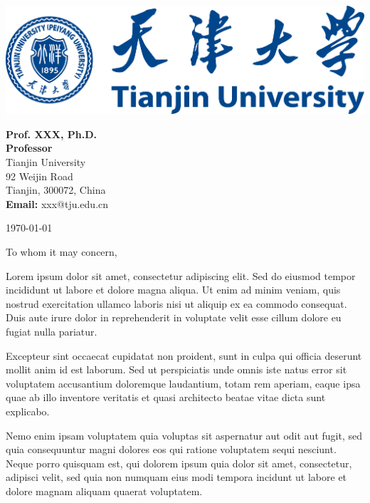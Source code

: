 \documentclass[10pt,a4paper]{article}
\begin{document}
\pagestyle{empty}

\begin{flushright}
\begin{minipage}{0.3\textwidth}
\raggedright
\includegraphics[width=\textwidth]{tju_tp.pdf}

\vspace{1em}

\textbf{Prof. XXX, Ph.D.}\\
\textbf{Professor}\\
Tianjin University\\
92 Weijin Road\\
Tianjin, 300072, China\\
\textbf{Email:} xxx@tju.edu.cn
\end{minipage}
\end{flushright}

\vspace{2em}

\today

\vspace{1em}

To whom it may concern,

\vspace{1em}

Lorem ipsum dolor sit amet, consectetur adipiscing elit. Sed do eiusmod tempor incididunt ut labore et dolore magna aliqua. Ut enim ad minim veniam, quis nostrud exercitation ullamco laboris nisi ut aliquip ex ea commodo consequat. Duis aute irure dolor in reprehenderit in voluptate velit esse cillum dolore eu fugiat nulla pariatur.

Excepteur sint occaecat cupidatat non proident, sunt in culpa qui officia deserunt mollit anim id est laborum. Sed ut perspiciatis unde omnis iste natus error sit voluptatem accusantium doloremque laudantium, totam rem aperiam, eaque ipsa quae ab illo inventore veritatis et quasi architecto beatae vitae dicta sunt explicabo.

Nemo enim ipsam voluptatem quia voluptas sit aspernatur aut odit aut fugit, sed quia consequuntur magni dolores eos qui ratione voluptatem sequi nesciunt. Neque porro quisquam est, qui dolorem ipsum quia dolor sit amet, consectetur, adipisci velit, sed quia non numquam eius modi tempora incidunt ut labore et dolore magnam aliquam quaerat voluptatem.
\end{document}
